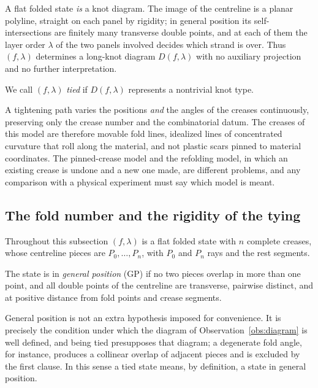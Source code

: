 \begin{observation}\label{obs:diagram}
A flat folded state \emph{is} a knot diagram. The image of the centreline is a planar polyline, straight on each panel by rigidity; in general position its self-intersections are finitely many transverse double points, and at each of them the layer order $\lambda$ of the two panels involved decides which strand is over. Thus $(f,\lambda)$ determines a long-knot diagram $D(f,\lambda)$ with no auxiliary projection and no further interpretation.
\end{observation}

We call $(f,\lambda)$ \emph{tied} if $D(f,\lambda)$ represents a nontrivial knot type.

\begin{remark}\label{rem:mobility}
A tightening path varies the positions \emph{and} the angles of the creases continuously, preserving only the crease number and the combinatorial datum. The creases of this model are therefore movable fold lines, idealized lines of concentrated curvature that roll along the material, and not plastic scars pinned to material coordinates. The pinned-crease model and the refolding model, in which an existing crease is undone and a new one made, are different problems, and any comparison with a physical experiment must say which model is meant.
\end{remark}

\subsection{The fold number and the rigidity of the tying}

Throughout this subsection $(f,\lambda)$ is a flat folded state with $n$ complete creases, whose centreline pieces are $P_0,\dots,P_n$, with $P_0$ and $P_n$ rays and the rest segments.

\begin{definition}\label{def:gp}
The state is in \emph{general position} (GP) if no two pieces overlap in more than one point, and all double points of the centreline are transverse, pairwise distinct, and at positive distance from fold points and crease segments.
\end{definition}

General position is not an extra hypothesis imposed for convenience. It is precisely the condition under which the diagram of Observation~\ref{obs:diagram} is well defined, and being tied presupposes that diagram; a degenerate fold angle, for instance, produces a collinear overlap of adjacent pieces and is excluded by the first clause. In this sense a tied state means, by definition, a state in general position.

